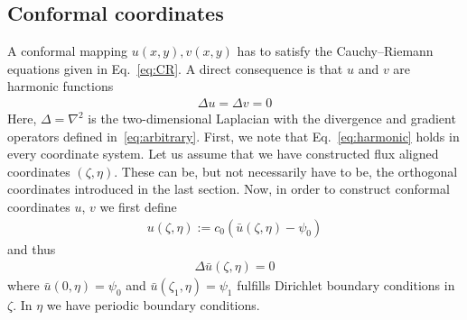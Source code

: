 \subsection{Conformal coordinates} \label{sec:conformal}
A conformal mapping $u(x,y), v(x,y)$ has to satisfy the Cauchy--Riemann equations given in Eq.~\eqref{eq:CR}.
A direct consequence is that $u$ and $v$ are harmonic functions 
\begin{align}
  \Delta u = \Delta v = 0
  \label{eq:harmonic}
\end{align}
Here, $\Delta=\nabla^2$ is the two-dimensional Laplacian with the divergence
and gradient operators defined in~\eqref{eq:arbitrary}.
First, we note that Eq.~\eqref{eq:harmonic} holds in every coordinate system.
Let us assume that we have constructed flux aligned  coordinates $(\zeta, \eta)$. These can be, but not necessarily have to be,
the orthogonal coordinates introduced in the last section. 
Now, in order to construct conformal coordinates $u$, $v$ we first define 
\begin{align}
u(\zeta,\eta):=c_0(\bar u(\zeta,\eta)-\psi_0)
  \label{eq:ubar}
\end{align}
and thus
\begin{align}
  \Delta \bar u(\zeta,\eta) = 0 %
  \label{eq:ubar_harmonic}
\end{align}
where $\bar u( 0, \eta) = \psi_0$ and $\bar u( \zeta_1, \eta) =\psi_1$ fulfills Dirichlet boundary conditions in $\zeta$. 
In $\eta$ we have periodic boundary conditions. 

